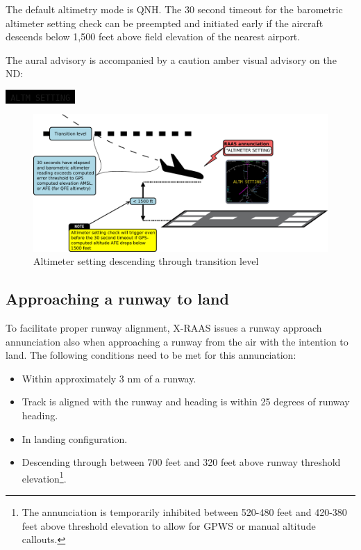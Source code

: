 \documentclass[a4paper,12pt]{article}
\newcommand{\visualadvisory}[3][b]{%
    \ifthenelse{\equal{#1}{b}}{\begin{center}}{}
    \noindent
    \colorbox{black}{\textcolor{#2visualadvisorycolor}{\large\texttt{~#3~}}}
    \ifthenelse{\equal{#1}{b}}{\end{center}}{}}
\begin{document}
\noindent The default altimetry mode is QNH. The 30 second timeout for
the barometric altimeter setting check can be preempted and initiated
early if the aircraft descends below 1,500 feet above field elevation of
the nearest airport.

The aural advisory is accompanied by a caution amber visual advisory on
the ND:

\visualadvisory{nonroutine}{ALTM SETTING}

\begin{figure}[H]
\begin{center}
\includegraphics[width=\textwidth]{../src/alt_setting_des.pdf}
\end{center}
\caption{Altimeter setting descending through transition level}
\end{figure}

\subsection{Approaching a runway to land}
\label{subsec:ApchAirMon}

To facilitate proper runway alignment, X-RAAS issues a runway approach
annunciation also when approaching a runway from the air with the
intention to land. The following conditions need to be met for this
annunciation:

\begin{itemize}

\item Within approximately 3 nm of a runway.

\item Track is aligned with the runway and heading is within 25 degrees
of runway heading.

\item In landing configuration.

\item Descending through between 700 feet and 320 feet above runway
threshold elevation\footnote{The annunciation is temporarily inhibited
between 520-480 feet and 420-380 feet above threshold elevation to allow
for GPWS or manual altitude callouts.}.

\end{itemize}
\end{document}
